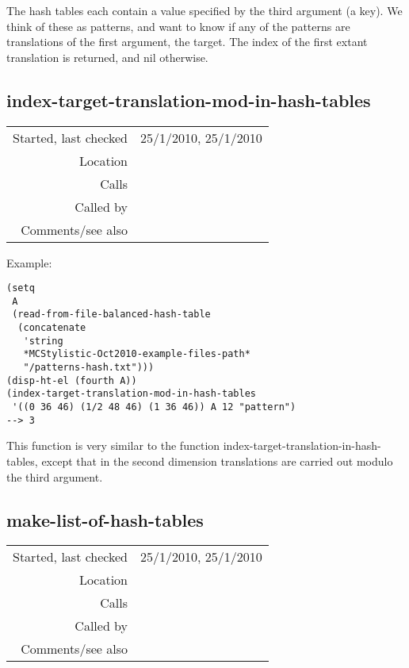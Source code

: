\noindent The hash tables each contain a value
specified by the third argument (a key). We think of
these as patterns, and want to know if any of the
patterns are translations of the first argument, the
target. The index of the first extant translation is
returned, and nil otherwise.


\subsection*{index-target-translation-mod-in-hash-tables}\label{fun:index-target-translation-mod-in-hash-tables}

\vspace{0.3cm}
\begin{tabular}{r|p{8cm}}
Started, last checked & 25/1/2010, 25/1/2010 \\
Location & \nameref{sec:hash-tables} \\
Calls & \nameref{fun:test-translation-mod-2nd-n} \\
Called by & \nameref{fun:number-of-targets-trans-mod-in-hash-tables} \\
Comments/see also &
\end{tabular}

\vspace{0.5cm}
\noindent Example:
\begin{verbatim}
(setq
 A
 (read-from-file-balanced-hash-table
  (concatenate
   'string
   *MCStylistic-Oct2010-example-files-path*
   "/patterns-hash.txt")))
(disp-ht-el (fourth A))
(index-target-translation-mod-in-hash-tables
 '((0 36 46) (1/2 48 46) (1 36 46)) A 12 "pattern")
--> 3
\end{verbatim}

\noindent This function is very similar to the
function index-target-translation-in-hash-tables,
except that in the second dimension translations are
carried out modulo the third argument.


\subsection*{make-list-of-hash-tables}\label{fun:make-list-of-hash-tables}

\vspace{0.3cm}
\begin{tabular}{r|p{8cm}}
Started, last checked & 25/1/2010, 25/1/2010 \\
Location & \nameref{sec:hash-tables} \\
Calls & \\
Called by & \nameref{fun:read-from-file-balanced-hash-table} \\
Comments/see also &
\end{tabular}

